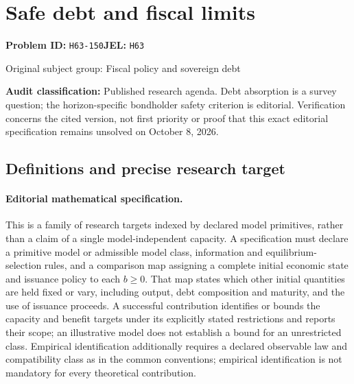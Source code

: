 \documentclass[11pt,a4paper]{article}
\begin{document}
\section*{Safe debt and fiscal limits}
\textbf{Problem ID:} \texttt{H63-150}\quad \textbf{JEL:} \texttt{H63}\par
\label{problem:OP-0254}
{\sffamily\small\color{muted}Original subject group: Fiscal policy and sovereign debt\par}
\label{definitions:problem:30007535}
\textbf{Audit classification:} Published research agenda. Debt absorption is a survey question; the horizon-specific bondholder safety criterion is editorial. Verification concerns the cited version, not first priority or proof that this exact editorial specification remains unsolved on October 8, 2026.
\subsection*{Definitions and precise research target}
\paragraph{Editorial mathematical specification.} This is a family of research targets indexed by declared model primitives, rather than a claim of a single model-independent capacity. A specification must declare a primitive model or admissible model class, information and equilibrium-selection rules, and a comparison map assigning a complete initial economic state and issuance policy to each \(b\ge0\). That map states which other initial quantities are held fixed or vary, including output, debt composition and maturity, and the use of issuance proceeds. A successful contribution identifies or bounds the capacity and benefit targets under its explicitly stated restrictions and reports their scope; an illustrative model does not establish a bound for an unrestricted class. Empirical identification additionally requires a declared observable law and compatibility class as in the common conventions; empirical identification is not mandatory for every theoretical contribution.
\end{document}
